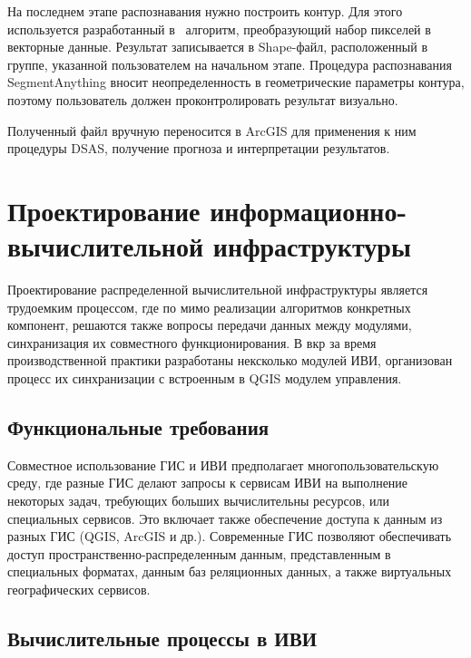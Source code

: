 \documentclass[732,14pt,final]{studrep}
\begin{document}
На последнем этапе распознавания нужно построить контур. Для этого используется разработанный в~\cite{b3} алгоритм, преобразующий набор пикселей в векторные данные. Результат записывается в Shape-файл, расположенный в группе, указанной пользователем на начальном этапе. Процедура распознавания SegmentAnything вносит неопределенность в геометрические параметры контура, поэтому пользователь должен проконтролировать результат визуально.

Полученный файл вручную переносится в ArcGIS для применения к ним процедуры DSAS, получение прогноза и интерпретации результатов.

\section{Проектирование информационно-вычислительной инфраструктуры}

Проектирование распределенной вычислительной инфраструктуры является трудоемким процессом, где по мимо реализации алгоритмов конкретных компонент, решаются также вопросы передачи данных между модулями, синхранизация их совместного функционирования. В вкр за время производственной практики разработаны нексколько модулей ИВИ, организован процесс их синхранизации с встроенным в QGIS модулем управления.

\subsection{Функциональные требования}

Совместное использование ГИС и ИВИ предполагает многопользовательскую среду, где разные ГИС делают запросы к сервисам ИВИ на выполнение некоторых задач, требующих больших вычислительны ресурсов, или специальных сервисов. Это включает также обеспечение доступа к данным из разных ГИС (QGIS, ArcGIS и др.). Современные ГИС позволяют обеспечивать доступ пространственно-распределенным данным, представленным в специальных форматах, данным баз реляционных данных, а также виртуальных географических сервисов.

\subsection{Вычислительные процессы в ИВИ}\label{sec:ivi}
\end{document}
